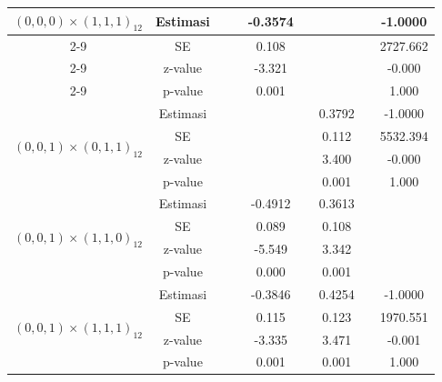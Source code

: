 \begin{enumerate}[label=\alph*.]
\begin{longtable}{|c|c|c|c|c|c|c|c|c|}
            \multirow{4}{*}{$(0,0,0)\times(1,1,1)_{12}$}
            & Estimasi & {} & {} & -0.3574 & {} & {} & {} & -1.0000\\ \cline{2-9}
            & SE       & {} & {} & 0.108 & {} & {} & {} & 2727.662\\ \cline{2-9}
            & z-value  & {} & {} & -3.321 & {}   & {}   & {} & -0.000\\ \cline{2-9}
            & p-value  & {} & {} & 0.001 & {} & {} & {} & 1.000\\ \hline

            \multirow{4}{*}{$(0,0,1)\times(0,1,1)_{12}$}
            & Estimasi & {} & {} & {} & {} & 0.3792 & {} & -1.0000 \\ \cline{2-9}
            & SE       & {} & {} & {} & {} & 0.112 & {} & 5532.394\\ \cline{2-9}
            & z-value  & {} & {} & {} & {} & 3.400 & {} & -0.000\\ \cline{2-9}
            & p-value  & {} & {} & {} & {} & 0.001 & {} & 1.000\\ \hline

            \multirow{4}{*}{$(0,0,1)\times(1,1,0)_{12}$}
            & Estimasi & {} & {} & -0.4912 & {}  & 0.3613 & {} & {}\\ \cline{2-9}
            & SE       & {} & {} & 0.089 & {} & 0.108 & {} & {}\\ \cline{2-9}
            & z-value  & {} & {} & -5.549 & {} & 3.342 & {} & {}\\ \cline{2-9}
            & p-value  & {} & {} & 0.000 & {} & 0.001 & {} & {} \\ \hline

            \multirow{4}{*}{$(0,0,1)\times(1,1,1)_{12}$}
            & Estimasi & {} & {} & -0.3846 & {} & 0.4254 & {} & -1.0000 \\ \cline{2-9}
            & SE       & {} & {} & 0.115   & {} & 0.123 & {} & 1970.551\\ \cline{2-9}
            & z-value  & {} & {} & -3.335  & {} & 3.471 & {} & -0.001\\ \cline{2-9}
            & p-value  & {} & {} & 0.001   & {} & 0.001 & {} & 1.000 \\ \hline


\end{longtable}
\end{enumerate}
